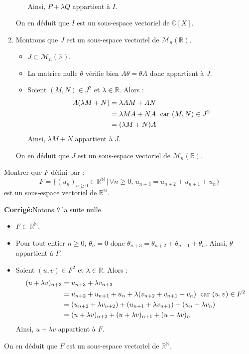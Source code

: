 \documentclass[a4paper,twoside,french,10pt]{VcCours}
\newcommand{\corr}{\textbf{Corrigé:}}
\begin{document}
\begin{enumerate}
\begin{itemize}
\begin{align*}
\end{align*}
Ainsi, $P+ \lambda Q$ appartient à $I$.
\end{itemize}
On en déduit que $I$ est un sous-espace vectoriel de $\mathbb{C}[X]$.
\item Montrons que $J$ est un sous-espace vectoriel de $\mathcal{M}_n(\mathbb{R})$.
\begin{itemize}
\item $J \subset \mathcal{M}_n(\mathbb{R})$.
\item La matrice nulle $\theta$ vérifie bien $A \theta = \theta A$ donc appartient à $J$.
\item Soient $(M,N) \in J^2$ et $\lambda \in \mathbb{R}$. Alors :
\begin{align*}
A(\lambda M + N) & = \lambda AM + AN \\
& = \lambda MA + NA \; \hbox{ car } (M,N) \in J^2 \\
& = (\lambda M+N) A 
\end{align*}
Ainsi, $\lambda M +N$ appartient à $J$.
\end{itemize}
On en déduit que $J$ est un sous-espace vectoriel de $\mathcal{M}_n(\mathbb{R})$.
\end{enumerate}

\medskip



\begin{Exercice}{} Montrer que $F$ défini par :
$$ F = \lbrace (u_n)_{n \geq 0} \in \mathbb{R}^{\mathbb{N}} \, \vert \, \forall n \geq 0, \, u_{n+3}=u_{n+2}+u_{n+1}+u_n \rbrace$$
est un sous-espace vectoriel de $\mathbb{R}^{\mathbb{N}}$.
\end{Exercice}

\corr Notons $\theta$ la suite nulle.

\begin{itemize}
\item $F \subset \mathbb{R}^{\mathbb{N}}$.
\item Pour tout entier $n \geq 0$, $\theta_n = 0$ donc $\theta_{n+3} = \theta_{n+2} + \theta_{n+1} + \theta_n$. Ainsi, $\theta$ appartient à $F$.
\item Soient $(u,v) \in F^2$ et $\lambda \in \mathbb{R}$. Alors :
\begin{align*}
(u+\lambda v)_{n+3} & = u_{n+3} + \lambda v_{n+3} \\
& = u_{n+2}+u_{n+1}+u_n + \lambda (v_{n+2}+v_{n+1}+v_n) \; \hbox{ car } (u,v) \in F^2 \\
& = (u_{n+2} + \lambda v_{n+2}) + (u_{n+1} + \lambda v_{n+1}) + (u_n + \lambda v_n) \\
& = (u+\lambda v)_{n+2} + (u+\lambda v)_{n+1} + (u+\lambda v)_{n}
\end{align*}
Ainsi, $u+ \lambda v$ appartient à $F$.
\end{itemize}
On en déduit que $F$ est un sous-espace vectoriel de $\mathbb{R}^{\mathbb{N}}$.
\end{document}

